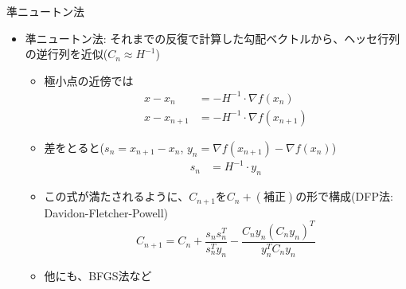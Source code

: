 \begin{frame}[t,fragile]{準ニュートン法}
  \begin{itemize}
  \item 準ニュートン法: それまでの反復で計算した勾配ベクトルから、ヘッセ行列の逆行列を近似($C_n \approx H^{-1}$)
  \begin{itemize}
    \item 極小点の近傍では
      \begin{align*}
          x-x_n &= -H^{-1} \cdot \nabla f(x_n) \\
          x-x_{n+1} &= -H^{-1} \cdot \nabla f(x_{n+1})
      \end{align*}
    \item 差をとると($s_n = x_{n+1} - x_n$, $y_n = \nabla f(x_{n+1}) - \nabla f(x_n)$)
      \begin{align*}
        s_n &= H^{-1} \cdot y_n
      \end{align*}
    \item この式が満たされるように、$C_{n+1}$を$C_{n}+(\text{補正})$の形で構成(DFP法: Davidon-Fletcher-Powell)
      \[
        C_{n+1} = C_{n} + \frac{s_n s_n^T}{s_n^T y_n} - \frac{C_{n} y_n (C_{n} y_n)^T}{y_n^T C_n y_n}
      \]
    \item 他にも、BFGS法など
    \end{itemize}
  \end{itemize}
\end{frame}
